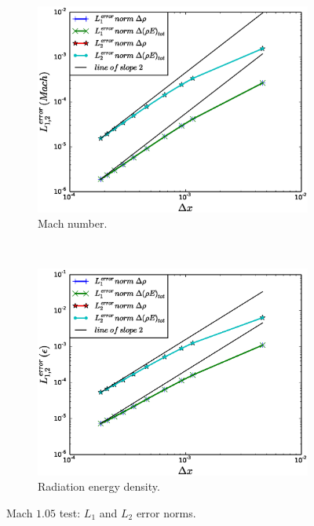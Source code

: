 \documentclass[times,doublespace]{fldauth}%
\begin{document}
\begin{figure}[h]
    \begin{subfigure}{0.5\textwidth}
    \centering
    \includegraphics[width=\linewidth]{figures/cst-xs/mach-1p05/mass-energy-diff-mach-number-convergence.eps}
    \caption{Mach number.}\label{fig:mach-1p05-cst-xs-mach-conv}
    \end{subfigure}
    ~
    \begin{subfigure}{0.5\textwidth}
    \centering
    \includegraphics[width=\linewidth]{figures/cst-xs/mach-1p05/mass-energy-diff-radiation-convergence.eps}
    \caption{Radiation energy density.}\label{fig:mach-1p05-cst-xs-radiation-conv}
    \end{subfigure}        
\caption{Mach $1.05$ test: $L_1$ and $L_2$ error norms.}\label{fig:mach-1p05-cst-xs-conv}    
\end{figure}
%
\end{document}
